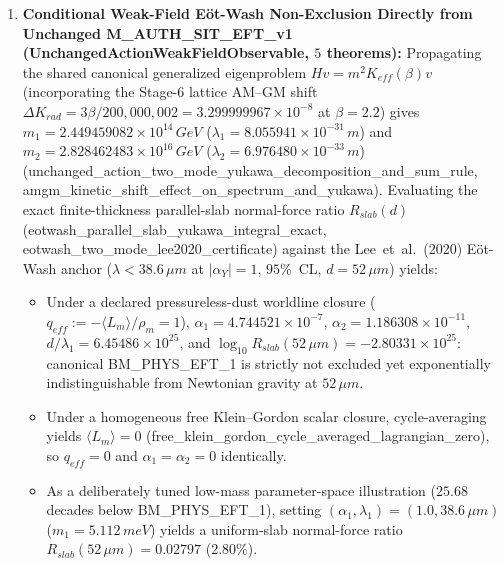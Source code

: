 \documentclass[american,11pt,letterpaper]{article}
\def\mathcal#1{#1}%
\def\mathrm#1{#1}%
\def\texttt#1{#1}%
\def\emph#1{#1}%
\begin{document}
\begin{enumerate}[leftmargin=2em]
  \item \textbf{Conditional Weak-Field E\"ot-Wash Non-Exclusion Directly from Unchanged \texttt{M\_AUTH\_SIT\_EFT\_v1} (\texttt{UnchangedActionWeakFieldObservable}, $5$ theorems):} Propagating the shared canonical generalized eigenproblem $H v = m^2 K_{\mathrm{eff}}(\beta) v$ (incorporating the Stage-6 lattice AM--GM shift $\Delta K_{\mathrm{rad}} = 3\beta/200{,}000{,}002 = 3.299999967\times 10^{-8}$ at $\beta = 2.2$) gives $m_1 = 2.449459082\times 10^{14}\,\mathrm{GeV}$ ($\lambda_1 = 8.055941\times 10^{-31}\,\mathrm{m}$) and $m_2 = 2.828462483\times 10^{16}\,\mathrm{GeV}$ ($\lambda_2 = 6.976480\times 10^{-33}\,\mathrm{m}$) (\texttt{unchanged\_\allowbreak{}action\_\allowbreak{}two\_\allowbreak{}mode\_\allowbreak{}yukawa\_\allowbreak{}decomposition\_\allowbreak{}and\_\allowbreak{}sum\_\allowbreak{}rule}, \texttt{amgm\_\allowbreak{}kinetic\_\allowbreak{}shift\_\allowbreak{}effect\_\allowbreak{}on\_\allowbreak{}spectrum\_\allowbreak{}and\_\allowbreak{}yukawa}). Evaluating the exact finite-thickness parallel-slab normal-force ratio $R_{\mathrm{slab}}(d)$ (\texttt{eotwash\_\allowbreak{}parallel\_\allowbreak{}slab\_\allowbreak{}yukawa\_\allowbreak{}integral\_\allowbreak{}exact}, \texttt{eotwash\_\allowbreak{}two\_\allowbreak{}mode\_\allowbreak{}lee2020\_\allowbreak{}certificate}) against the Lee~\emph{et~al.}\ (2020) E\"ot-Wash anchor ($\lambda < 38.6\,\mu\mathrm{m}$ at $|\alpha_Y| = 1$, $95\%$~CL, $d = 52\,\mu\mathrm{m}$) yields:
  \begin{itemize}
    \item Under a declared pressureless-dust worldline closure ($q_{\mathrm{eff}} := -\langle\mathcal{L}_m\rangle/\rho_m = 1$), $\alpha_1 = 4.744521\times 10^{-7}$, $\alpha_2 = 1.186308\times 10^{-11}$, $d/\lambda_1 = 6.45486\times 10^{25}$, and $\log_{10} R_{\mathrm{slab}}(52\,\mu\mathrm{m}) = -2.80331\times 10^{25}$: canonical \texttt{BM\_PHYS\_EFT\_1} is strictly not excluded yet exponentially indistinguishable from Newtonian gravity at $52\,\mu\mathrm{m}$.
    \item Under a homogeneous free Klein--Gordon scalar closure, cycle-averaging yields $\langle\mathcal{L}_m\rangle = 0$ (\texttt{free\_\allowbreak{}klein\_\allowbreak{}gordon\_\allowbreak{}cycle\_\allowbreak{}averaged\_\allowbreak{}lagrangian\_\allowbreak{}zero}), so $q_{\mathrm{eff}} = 0$ and $\alpha_1 = \alpha_2 = 0$ identically.
    \item As a deliberately tuned low-mass parameter-space illustration ($25.68$ decades below \texttt{BM\_PHYS\_EFT\_1}), setting $(\alpha_1, \lambda_1) = (1.0, 38.6\,\mu\mathrm{m})$ ($m_1 = 5.112\,\mathrm{meV}$) yields a uniform-slab normal-force ratio $R_{\mathrm{slab}}(52\,\mu\mathrm{m}) = 0.02797$ ($2.80\%$).

\end{itemize}
\end{enumerate}
\end{document}
